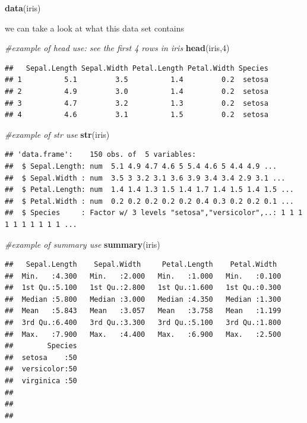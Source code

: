 \documentclass[
]{article}
\newenvironment{Shaded}{\begin{snugshade}}{\end{snugshade}}
\newcommand{\CommentTok}[1]{\textcolor[rgb]{0.56,0.35,0.01}{\textit{#1}}}
\newcommand{\DecValTok}[1]{\textcolor[rgb]{0.00,0.00,0.81}{#1}}
\newcommand{\FunctionTok}[1]{\textcolor[rgb]{0.13,0.29,0.53}{\textbf{#1}}}
\newcommand{\NormalTok}[1]{#1}
\begin{document}
\begin{Shaded}
\begin{Highlighting}[]
\FunctionTok{data}\NormalTok{(iris)}
\end{Highlighting}
\end{Shaded}

we can take a look at what this data set contains

\begin{Shaded}
\begin{Highlighting}[]
\CommentTok{\#example of head use: see the first 4 rows in iris}
\FunctionTok{head}\NormalTok{(iris,}\DecValTok{4}\NormalTok{)}
\end{Highlighting}
\end{Shaded}

\begin{verbatim}
##   Sepal.Length Sepal.Width Petal.Length Petal.Width Species
## 1          5.1         3.5          1.4         0.2  setosa
## 2          4.9         3.0          1.4         0.2  setosa
## 3          4.7         3.2          1.3         0.2  setosa
## 4          4.6         3.1          1.5         0.2  setosa
\end{verbatim}

\begin{Shaded}
\begin{Highlighting}[]
\CommentTok{\#example of str use}
\FunctionTok{str}\NormalTok{(iris)}
\end{Highlighting}
\end{Shaded}

\begin{verbatim}
## 'data.frame':    150 obs. of  5 variables:
##  $ Sepal.Length: num  5.1 4.9 4.7 4.6 5 5.4 4.6 5 4.4 4.9 ...
##  $ Sepal.Width : num  3.5 3 3.2 3.1 3.6 3.9 3.4 3.4 2.9 3.1 ...
##  $ Petal.Length: num  1.4 1.4 1.3 1.5 1.4 1.7 1.4 1.5 1.4 1.5 ...
##  $ Petal.Width : num  0.2 0.2 0.2 0.2 0.2 0.4 0.3 0.2 0.2 0.1 ...
##  $ Species     : Factor w/ 3 levels "setosa","versicolor",..: 1 1 1 1 1 1 1 1 1 1 ...
\end{verbatim}

\begin{Shaded}
\begin{Highlighting}[]
\CommentTok{\#example of summary use}
\FunctionTok{summary}\NormalTok{(iris)}
\end{Highlighting}
\end{Shaded}

\begin{verbatim}
##   Sepal.Length    Sepal.Width     Petal.Length    Petal.Width   
##  Min.   :4.300   Min.   :2.000   Min.   :1.000   Min.   :0.100  
##  1st Qu.:5.100   1st Qu.:2.800   1st Qu.:1.600   1st Qu.:0.300  
##  Median :5.800   Median :3.000   Median :4.350   Median :1.300  
##  Mean   :5.843   Mean   :3.057   Mean   :3.758   Mean   :1.199  
##  3rd Qu.:6.400   3rd Qu.:3.300   3rd Qu.:5.100   3rd Qu.:1.800  
##  Max.   :7.900   Max.   :4.400   Max.   :6.900   Max.   :2.500  
##        Species  
##  setosa    :50  
##  versicolor:50  
##  virginica :50  
##                 
##                 
## 
\end{verbatim}
\end{document}
